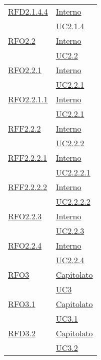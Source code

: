 \begin{longtable}{|>{\centering}m{5cm}|m{5cm}<{\centering}|}
\hyperlink{RFD2.1.4.4}{RFD2.1.4.4} & \hyperlink{Interno}{Interno}\\
& \hyperref[UC2.1.4]{UC2.1.4}\\ \hline

\hyperlink{RFO2.2}{RFO2.2} & \hyperlink{Interno}{Interno}\\
& \hyperref[UC2.2]{UC2.2}\\ \hline

\hyperlink{RFO2.2.1}{RFO2.2.1} & \hyperlink{Interno}{Interno}\\
& \hyperref[UC2.2.1]{UC2.2.1}\\ \hline

\hyperlink{RFO2.2.1.1}{RFO2.2.1.1} & \hyperlink{Interno}{Interno}\\
& \hyperref[UC2.2.1]{UC2.2.1}\\ \hline

\hyperlink{RFF2.2.2}{RFF2.2.2} & \hyperlink{Interno}{Interno}\\
& \hyperref[UC2.2.2]{UC2.2.2}\\ \hline

\hyperlink{RFF2.2.2.1}{RFF2.2.2.1} & \hyperlink{Interno}{Interno}\\
& \hyperref[UC2.2.2.1]{UC2.2.2.1}\\ \hline

\hyperlink{RFF2.2.2.2}{RFF2.2.2.2} & \hyperlink{Interno}{Interno}\\
& \hyperref[UC2.2.2.2]{UC2.2.2.2}\\ \hline

\hyperlink{RFO2.2.3}{RFO2.2.3} & \hyperlink{Interno}{Interno}\\
& \hyperref[UC2.2.3]{UC2.2.3}\\ \hline

\hyperlink{RFO2.2.4}{RFO2.2.4} & \hyperlink{Interno}{Interno}\\
& \hyperref[UC2.2.4]{UC2.2.4}\\ \hline

\hyperlink{RFO3}{RFO3} & \hyperlink{Capitolato}{Capitolato}\\
& \hyperref[UC3]{UC3}\\ \hline

\hyperlink{RFO3.1}{RFO3.1} & \hyperlink{Capitolato}{Capitolato}\\
& \hyperref[UC3.1]{UC3.1}\\ \hline

\hyperlink{RFD3.2}{RFD3.2} & \hyperlink{Capitolato}{Capitolato}\\
& \hyperref[UC3.2]{UC3.2}\\ \hline


\end{longtable}
